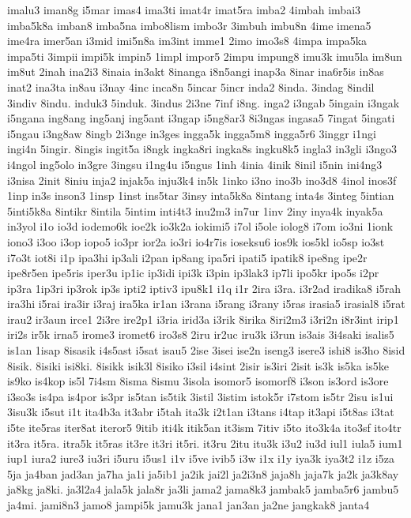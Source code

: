 {imalu3 iman8g i5mar imas4 ima3ti imat4r imat5ra imba2 4imbah imbai3
imba5k8a imban8 imba5na imbo8lism imbo3r 3imbuh imbu8n 4ime imena5 ime4ra
imer5an i3mid imi5n8a im3int imme1 2imo imo3s8 4impa impa5ka impa5ti
3impii impi5k impin5 1impl impor5 2impu impung8 imu3k imu5la im8un im8ut
2inah ina2i3 8inaia in3akt 8inanga i8n5angi inap3a 8inar ina6r5is in8as
inat2 ina3ta in8au i3nay 4inc inca8n 5incar 5incr inda2 8inda. 3indag
8indil 3indiv 8indu. induk3 5induk. 3indus 2i3ne 7inf i8ng. inga2 i3ngab
5ingain i3ngak i5ngana ing8ang ing5anj ing5ant i3ngap i5ng8ar3 8i3ngas
ingasa5 7ingat 5ingati i5ngau i3ng8aw 8ingb 2i3nge in3ges ingga5k ingga5m8
ingga5r6 3inggr i1ngi ingi4n 5ingir. 8ingis ingit5a i8ngk ingka8ri ingka8s
ingku8k5 ingla3 in3gli i3ngo3 i4ngol ing5olo in3gre 3ingsu i1ng4u i5ngus
1inh 4inia 4inik 8inil i5nin ini4ng3 i3nisa 2init 8iniu inja2 injak5a
inju3k4 in5k 1inko i3no ino3b ino3d8 4inol inos3f 1inp in3s inson3 1insp
1inst ins5tar 3insy inta5k8a 8intang inta4s 3integ 5intian 5inti5k8a
8intikr 8intila 5intim inti4t3 inu2m3 in7ur 1inv 2iny inya4k inyak5a
in3yol i1o io3d iodemo6k ioe2k io3k2a iokimi5 i7ol i5ole iolog8 i7om io3ni
1ionk iono3 i3oo i3op iopo5 io3pr ior2a io3ri io4r7is ioseksu6 ios9k
ios5kl io5sp io3st i7o3t iot8i i1p ipa3hi ip3ali i2pan ip8ang ipa5ri
ipati5 ipatik8 ipe8ng ipe2r ipe8r5en ipe5ris iper3u ip1ic ip3idi ipi3k
i3pin ip3lak3 ip7li ipo5kr ipo5s i2pr ip3ra 1ip3ri ip3rok ip3s ipti2
iptiv3 ipu8k1 i1q i1r 2ira i3ra. i3r2ad iradika8 i5rah ira3hi i5rai ira3ir
i3raj ira5ka ir1an i3rana i5rang i3rany i5ras irasia5 irasial8 i5rat irau2
ir3aun irce1 2i3re ire2p1 i3ria irid3a i3rik 8irika 8iri2m3 i3ri2n i8r3int
irip1 iri2s ir5k irna5 irome3 iromet6 iro3s8 2iru ir2uc iru3k i3run is3ais
3i4saki isalis5 is1an 1isap 8isasik i4s5ast i5sat isau5 2ise 3isei ise2n
iseng3 isere3 ishi8 is3ho 8isid 8isik. 8isiki isi8ki. 8isikk isik3l 8isiko
i3sil i4sint 2isir is3iri 2isit is3k is5ka is5ke is9ko is4kop is5l 7i4sm
8isma 8ismu 3isola isomor5 isomorf8 i3son is3ord is3ore i3so3s is4pa
is4por is3pr is5tan is5tik 3istil 3istim istok5r i7stom is5tr 2isu is1ui
3isu3k i5sut i1t ita4b3a it3abr i5tah ita3k i2t1an i3tans i4tap it3api
i5t8as i3tat i5te ite5ras iter8at iteror5 9itib iti4k itik5an it3ism 7itiv
i5to ito3k4a ito3sf ito4tr it3ra it5ra. itra5k it5ras it3re it3ri it5ri.
it3ru 2itu itu3k i3u2 iu3d iul1 iula5 ium1 iup1 iura2 iure3 iu3ri i5uru
i5us1 i1v i5ve ivib5 i3w i1x i1y iya3k iya3t2 i1z i5za 5ja ja4ban jad3an
ja7ha ja1i ja5ib1 ja2ik jai2l ja2i3n8 jaja8h jaja7k ja2k ja3k8ay ja8kg
ja8ki. ja3l2a4 jala5k jala8r ja3li jama2 jama8k3 jambak5 jamba5r6 jambu5
ja4mi. jami8n3 jamo8 jampi5k jamu3k jana1 jan3an ja2ne jangkak8 janta4
}
